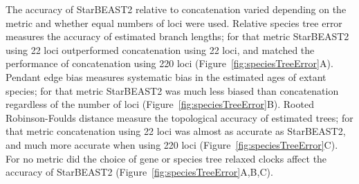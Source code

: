 \documentclass[12pt]{article}
\begin{document}
The accuracy of StarBEAST2 relative to concatenation varied depending on the
metric and whether equal numbers of loci were used. Relative species tree error
measures the accuracy of estimated branch lengths; for that metric StarBEAST2
using 22 loci outperformed concatenation using 22 loci, and matched the
performance of concatenation using 220 loci
(Figure~\ref{fig:speciesTreeError}A). Pendant edge bias measures systematic bias
in the estimated ages of extant species; for that metric StarBEAST2 was much
less biased than concatenation regardless of the number of loci
(Figure~\ref{fig:speciesTreeError}B). Rooted Robinson-Foulds distance measure
the topological accuracy of estimated trees; for that metric concatenation using
22 loci was almost as accurate as StarBEAST2, and much more accurate when using
220 loci (Figure~\ref{fig:speciesTreeError}C). For no metric did the choice of
gene or species tree relaxed clocks affect the accuracy of StarBEAST2
(Figure~\ref{fig:speciesTreeError}A,B,C).
\end{document}
